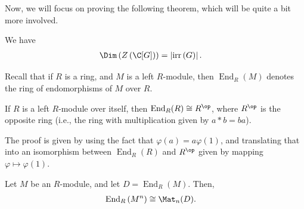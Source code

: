 \documentclass[10pt]{mypackage}
\begin{document}
Now, we will focus on proving the following theorem, which will be quite a bit more involved.
\begin{theorem}
  We have
  \begin{align*}
    \Dim\left( Z\left( \C[G] \right) \right) &= \left\vert \operatorname{irr}\left( G \right) \right\vert.
  \end{align*}
\end{theorem}
Recall that if $R$ is a ring, and $M$ is a left $R$-module, then $\operatorname{End}_R(M)$ denotes the ring of endomorphisms of $M$ over $R$.
\begin{lemma}
  If $R$ is a left $R$-module over itself, then $\operatorname{End}_R(R)\cong R^{\op}$, where $R^{\op}$ is the opposite ring (i.e., the ring with multiplication given by $a\ast b = ba$).
\end{lemma}
The proof is given by using the fact that $\varphi\left( a \right) = a\varphi(1)$, and translating that into an isomorphism between $\operatorname{End}_R(R)$ and $R^{\op}$ given by mapping $\varphi\mapsto \varphi(1)$.
\begin{lemma}
  Let $M$ be an $R$-module, and let $D = \operatorname{End}_R(M)$. Then,
  \begin{align*}
    \operatorname{End}_R\left(M^{n}\right) &\cong \Mat_n(D).
  \end{align*}
\end{lemma}
\end{document}
